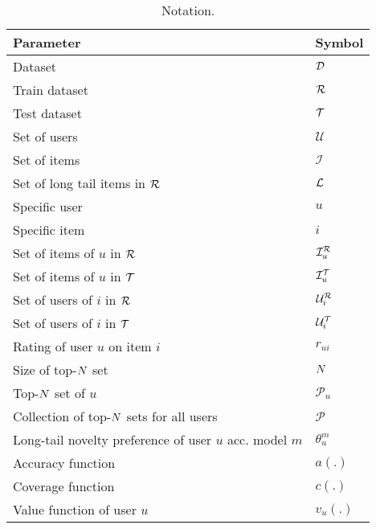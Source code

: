 \begin{table}[t]
\centering
\small
\begin{tabular}{ll}
  \toprule

  {\bf Parameter} & {\bf Symbol}  \\ 
  \midrule
  Dataset & $\mathcal{D}$\\	
  Train dataset & $\mathcal{R}$\\
  Test dataset & $\mathcal{T}$\\  
 

  Set of users & $\mathcal{U}$ \\
  Set of items & $\mathcal{I}$ \\  
  Set of long tail items in $\mathcal{R}$ & $\mathcal{L}$ \\ 
  
  Specific user & $u$ \\ 
  Specific item & $i$ \\
  Set of items of $u$ in $\mathcal{R}$ & $\mathcal{I}_{u}^{\mathcal{R}}$ \\
  Set of items of $u$ in $\mathcal{T}$ & $\mathcal{I}_{u}^{\mathcal{T}}$ \\
  Set of users of $i$ in $\mathcal{R}$ & $\mathcal{U}_{i}^{\mathcal{R}}$ \\
  Set of users of $i$ in $\mathcal{T}$ & $\mathcal{U}_{i}^{\mathcal{T}}$ \\ 	  
  
  Rating of user $u$ on item $i$ & $r_{ui}$ \\ 
  Size of top-$N$ set & $N$ \\
  
  Top-$N$ set of $u$ & $\mathcal{P}_u$ \\
  Collection of top-$N$ sets for all users & $\mathcal{P}$ \\
 
 Long-tail novelty preference of user $u$ acc. model $m$ & $\theta^{m}_u$ \\
    
  Accuracy function  & $a(.)$ \\
  Coverage function  & $c(.)$ \\
  Value function of user $u$ & $v_{u}(.)$ \\
   
\bottomrule
\end{tabular}
\caption{Notation.}
\label{tab:notation}
\end{table}

